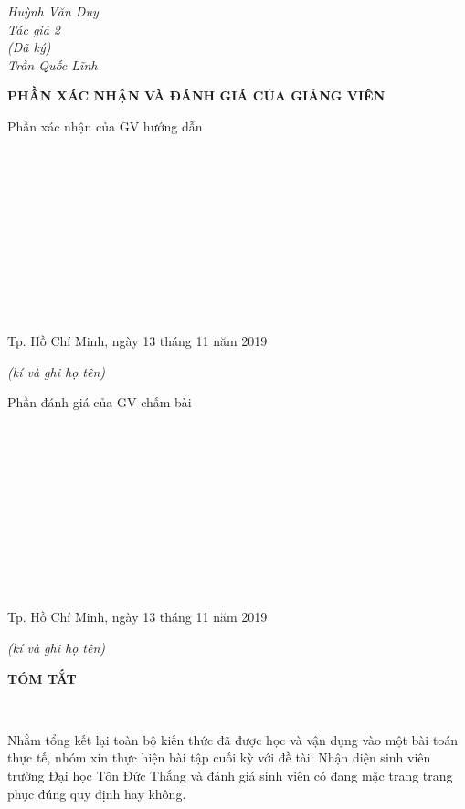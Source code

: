 \documentclass{report}
\begin{document}
\setlength{\parindent}{12cm}
\textit{Huỳnh Văn Duy}\\


\setlength{\parindent}{12.5cm}
\textit{Tác giả 2}\\

\setlength{\parindent}{12.5cm}
\textit{(Đã ký)}\\

\setlength{\parindent}{12cm}
\textit{Trần Quốc Lĩnh}\\


\newpage
\changefontsizes{16pt}
\centerline{\textbf{PHẦN XÁC NHẬN VÀ ĐÁNH GIÁ CỦA GIẢNG VIÊN}}
\bigskip
\changefontsizes{13pt}
\setlength{\parindent}{2.2cm}
Phần xác nhận của GV hướng dẫn

\vspace{0.8cm}
\setlength{\parindent}{1cm}
\ \xfill{1pt} \

\bigskip
\ \xfill{1pt} \

\bigskip
\ \xfill{1pt} \

\bigskip
\ \xfill{1pt} \

\bigskip
\ \xfill{1pt} \

\bigskip
\ \xfill{1pt} \

\changefontsizes{12pt}
\setlength{\parindent}{8cm}
Tp. Hồ Chí Minh, ngày 13 tháng 11 năm 2019

\setlength{\parindent}{11cm}
\textit{(kí và ghi họ tên)}

\changefontsizes{13pt}
\vspace{2.5cm}
\setlength{\parindent}{2.2cm}
Phần đánh giá của GV chấm bài

\vspace{0.8cm}
\setlength{\parindent}{1cm}
\ \xfill{1pt} \

\bigskip
\ \xfill{1pt} \

\bigskip
\ \xfill{1pt} \

\bigskip
\ \xfill{1pt} \

\bigskip
\ \xfill{1pt} \

\bigskip
\ \xfill{1pt} \

\changefontsizes{12pt}
\setlength{\parindent}{8cm}
Tp. Hồ Chí Minh, ngày 13 tháng 11 năm 2019

\setlength{\parindent}{11cm}
\textit{(kí và ghi họ tên)}

\newpage
\changefontsizes{16pt}
\centerline{\textbf{TÓM TẮT}}\

\changefontsizes{13pt}
\setlength{\parindent}{2cm}
Nhằm tổng kết lại toàn bộ kiến thức đã được học và vận dụng vào một bài toán thực tế, nhóm xin thực hiện bài tập cuối kỳ với đề tài: Nhận diện sinh viên trường Đại học Tôn Đức Thắng và đánh giá sinh viên có đang mặc trang trang phục đúng quy định hay không.
\end{document}
